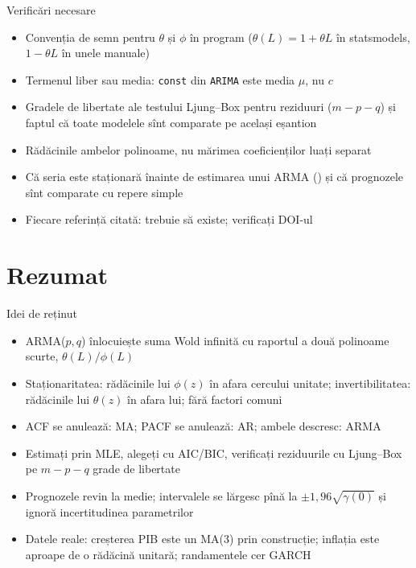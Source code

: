 \begin{frame}{Verificări necesare}
\itemsize{\small}
\begin{itemize}
    \item Convenția de semn pentru $\theta$ și $\phi$ în program ($\theta(L) = 1 + \theta L$ în statsmodels, $1 - \theta L$ în unele manuale)
    \item Termenul liber sau media: \texttt{const} din \texttt{ARIMA} este media $\mu$, nu $c$
    \item Gradele de libertate ale testului Ljung--Box pentru reziduuri ($m - p - q$) și faptul că toate modelele sînt comparate pe același eșantion
    \item Rădăcinile ambelor polinoame, nu mărimea coeficienților luați separat
    \item Că seria este staționară înainte de estimarea unui ARMA () și că prognozele sînt comparate cu repere simple
    \item Fiecare referință citată: trebuie să existe; verificați DOI-ul
\end{itemize}
\end{frame}


\section{Rezumat}

\begin{frame}{Idei de reținut}
\itemsize{\small}
\begin{itemize}
    \item ARMA($p,q$) înlocuiește suma Wold infinită cu raportul a două polinoame scurte, $\theta(L)/\phi(L)$
    \item Staționaritatea: rădăcinile lui $\phi(z)$ în afara cercului unitate; invertibilitatea: rădăcinile lui $\theta(z)$ în afara lui; fără factori comuni
    \item ACF se anulează: MA; PACF se anulează: AR; ambele descresc: ARMA
    \item Estimați prin MLE, alegeți cu AIC/BIC, verificați reziduurile cu Ljung--Box pe $m - p - q$ grade de libertate
    \item Prognozele revin la medie; intervalele se lărgesc pînă la $\pm 1{,}96\sqrt{\gamma(0)}$ și ignoră incertitudinea parametrilor
    \item Datele reale: creșterea PIB este un MA(3) prin construcție; inflația este aproape de o rădăcină unitară; randamentele cer GARCH
\end{itemize}
\end{frame}

